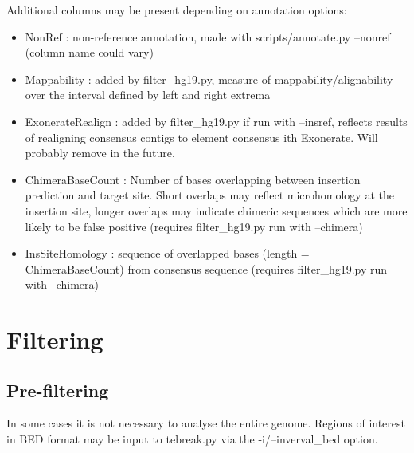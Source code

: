 \documentclass[letterpaper,11pt]{article}
\begin{document}
Additional columns may be present depending on annotation options:

\begin{itemize}
\item NonRef : non-reference annotation, made with scripts/annotate.py --nonref (column name could vary)
\item Mappability : added by filter\_hg19.py, measure of mappability/alignability over the interval defined by left and right extrema
\item ExonerateRealign : added by filter\_hg19.py if run with --insref, reflects results of realigning consensus contigs to element consensus ith Exonerate. Will probably remove in the future.
\item ChimeraBaseCount : Number of bases overlapping between insertion prediction and target site. Short overlaps may reflect microhomology at the insertion site, longer overlaps may indicate chimeric sequences which are more likely to be false positive (requires filter\_hg19.py run with --chimera)
\item InsSiteHomology : sequence of overlapped bases (length = ChimeraBaseCount) from consensus sequence (requires filter\_hg19.py run with --chimera)
\end{itemize}

\section{Filtering}

\subsection{Pre-filtering}
In some cases it is not necessary to analyse the entire genome. Regions of interest in BED format may be input to tebreak.py via the -i/--inverval\_bed option.
\end{document}
